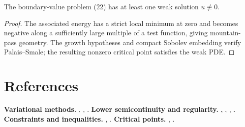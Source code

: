 \begin{theorem}
\label{thm:existence-nontrivial-solution-semilinear-elliptic}

The boundary-value problem (22) has at least one weak solution $u \not\equiv 0$.
\end{theorem}

\begin{proof}
\sketch The associated energy has a strict local minimum at zero and becomes negative along a sufficiently large multiple of a test function, giving mountain-pass geometry. The growth hypotheses and compact Sobolev embedding verify Palais--Smale; the resulting nonzero critical point satisfies the weak PDE.
\end{proof}

\section{References}
\label{sec:calculus-of-variations-references}
\textbf{Variational methods.} \cite{Giaquinta1983}, \cite{GiaquintaHildebrandt1996}, \cite{Zeidler1985}.
\textbf{Lower semicontinuity and regularity.} \cite{LadyzhenskayaUraltseva1968}, \cite{Giaquinta1983}, \cite{GilbargTrudinger1983}, \cite{GilbargTrudinger1983}.
\textbf{Constraints and inequalities.} \cite{KinderlehrerStampacchia1980}, \cite{DacorognaMoser1990}.
\textbf{Critical points.} \cite{Rabinowitz1986}, \cite{Giaquinta1983}.
